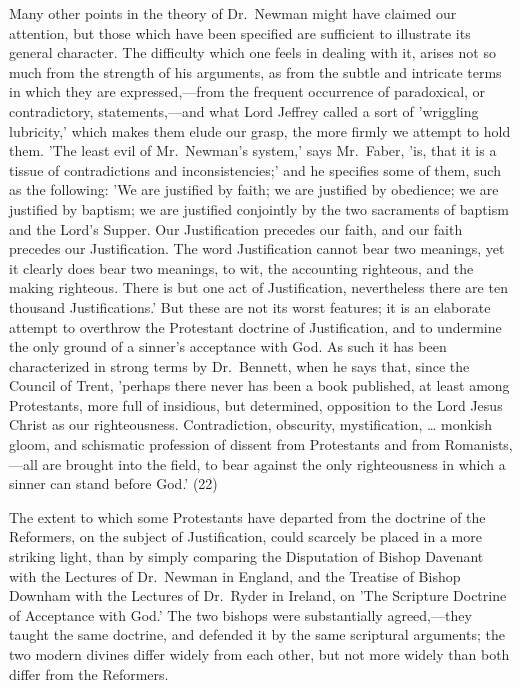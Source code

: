 \documentclass[
]{book}
\begin{document}
Many other points in the theory of Dr.~Newman might have claimed our attention, but those which have been specified are sufficient to illustrate its general character. The difficulty which one feels in dealing with it, arises not so much from the strength of his arguments, as from the subtle and intricate terms in which they are expressed,---from the frequent occurrence of paradoxical, or contradictory, statements,---and what Lord Jeffrey called a sort of 'wriggling lubricity,' which makes them elude our grasp, the more firmly we attempt to hold them. 'The least evil of Mr.~Newman's system,' says Mr.~Faber, 'is, that it is a tissue of contradictions and inconsistencies;' and he specifies some of them, such as the following: 'We are justified by faith; we are justified by obedience; we are justified by baptism; we are justified conjointly by the two sacraments of baptism and the Lord's Supper. Our Justification precedes our faith, and our faith precedes our Justification. The word Justification cannot bear two meanings, yet it clearly does bear two meanings, to wit, the accounting righteous, and the making righteous. There is but one act of Justification, nevertheless there are ten thousand Justifications.' But these are not its worst features; it is an elaborate attempt to overthrow the Protestant doctrine of Justification, and to undermine the only ground of a sinner's acceptance with God. As such it has been characterized in strong terms by Dr.~Bennett, when he says that, since the Council of Trent, 'perhaps there never has been a book published, at least among Protestants, more full of insidious, but determined, opposition to the Lord Jesus Christ as our righteousness. Contradiction, obscurity, mystification, \ldots{} monkish gloom, and schismatic profession of dissent from Protestants and from Romanists,---all are brought into the field, to bear against the only righteousness in which a sinner can stand before God.' (22)

The extent to which some Protestants have departed from the doctrine of the Reformers, on the subject of Justification, could scarcely be placed in a more striking light, than by simply comparing the Disputation of Bishop Davenant with the Lectures of Dr.~Newman in England, and the Treatise of Bishop Downham with the Lectures of Dr.~Ryder in Ireland, on 'The Scripture Doctrine of Acceptance with God.' The two bishops were substantially agreed,---they taught the same doctrine, and defended it by the same scriptural arguments; the two modern divines differ widely from each other, but not more widely than both differ from the Reformers.
\end{document}
